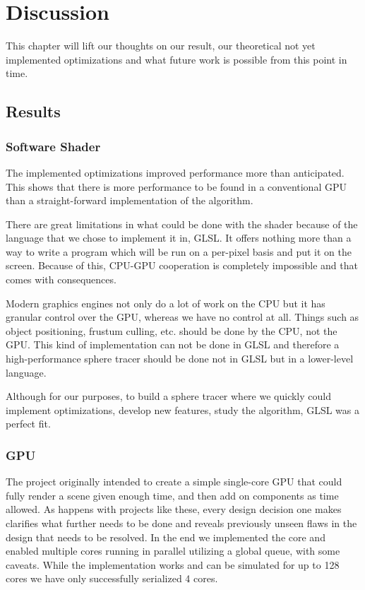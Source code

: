 \chapter{Discussion}
This chapter will lift our thoughts on our result, our theoretical not yet implemented optimizations and
what future work is possible from this point in time.
	
	\section{Results}
		
		\subsection{Software Shader}
		
			The implemented optimizations improved performance more than anticipated.
			This shows that there is more performance to be found in a conventional
			GPU than a straight-forward implementation of the algorithm. 

			There are great limitations in what could be done with the shader because
			of the language that we chose to implement it in, GLSL. It offers nothing 
			more than a way to write a program which will be run on a per-pixel basis
			and put it on the screen. Because of this, CPU-GPU cooperation is completely
			impossible and that comes with consequences.

			Modern graphics engines not only do a lot of work on the
			CPU but it has granular control over the GPU, whereas we have no control
			at all. Things such as object positioning, frustum culling, etc. should be 
			done by the CPU, not the GPU. This kind of implementation can 
			not be done in GLSL and therefore a high-performance sphere tracer should be done not in 
			GLSL but in a lower-level language.

			Although for our purposes, to build a sphere tracer where we quickly could implement
			optimizations, develop new features, study the algorithm, GLSL was a
			perfect fit. 

		
		\subsection{GPU} 
		
			The project originally intended to create a simple single-core GPU
			that could fully render a scene given enough time, and then add on
			components as time allowed. As happens with projects like these,
			every design decision one makes clarifies what further needs to be
			done and reveals previously unseen flaws in the design that needs
			to be resolved. In the end we implemented the core and enabled
			multiple cores running in parallel utilizing a global queue, with
			some caveats. While the implementation works and can be simulated
			for up to 128 cores we have only successfully serialized 4 cores. 
			
